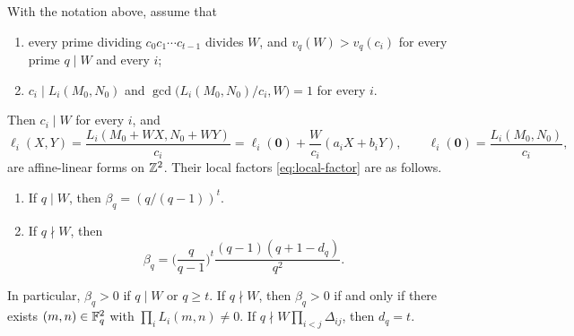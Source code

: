 \begin{lemma}\label{lem:local-factors}
With the notation above, assume that
\begin{enumerate}[label=(\roman*)]
\item\label{item:lf-cofactors} every prime dividing $c_0c_1\cdots c_{t-1}$ divides $W$, and $v_q(W)>v_q(c_i)$ for every prime $q\mid W$ and every $i$;
\item\label{item:lf-anchor} $c_i\mid L_i(M_0,N_0)$ and $\gcd\big(L_i(M_0,N_0)/c_i,W\big)=1$ for every $i$.
\end{enumerate}
Then $c_i\mid W$ for every $i$, and
\begin{equation}\label{eq:affine-forms}
\ell_i(X,Y)=\frac{L_i(M_0+WX,N_0+WY)}{c_i}=\ell_i(\mathbf 0)+\frac W{c_i}(a_iX+b_iY),\qquad\ell_i(\mathbf 0)=\frac{L_i(M_0,N_0)}{c_i},
\end{equation}
are affine-linear forms on $\mathbb Z^2$. Their local factors \eqref{eq:local-factor} are as follows.
\begin{enumerate}[label=(\alph*)]
\item\label{item:lf-divides} If $q\mid W$, then $\beta_q=(q/(q-1))^t$.
\item\label{item:lf-coprime} If $q\nmid W$, then
\begin{equation}\label{eq:local-factor-formula}
\beta_q=\Big(\frac q{q-1}\Big)^t\frac{(q-1)(q+1-d_q)}{q^2}.
\end{equation}
\end{enumerate}
In particular, $\beta_q>0$ if $q\mid W$ or $q\ge t$. If $q\nmid W$, then $\beta_q>0$ if and only if there exists $(m,n)\in\mathbb F_q^2$ with $\prod_iL_i(m,n)\ne0$. If $q\nmid W\prod_{i<j}\Delta_{ij}$, then $d_q=t$.
\end{lemma}

